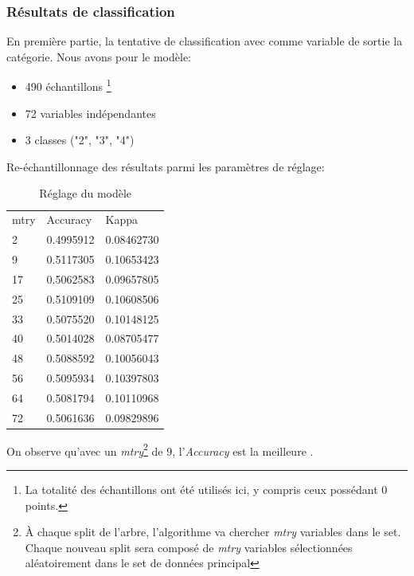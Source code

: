 \newpage
\subsubsection{Résultats de classification}
En première partie, la tentative de classification avec comme variable de sortie la catégorie. Nous avons pour le modèle:

\begin{itemize}
	\item 490 échantillons \footnote{La totalité des échantillons ont été utilisés ici, y compris ceux possédant 0 points.}
	\item 72 variables indépendantes
	\item 3 classes ("2", "3", "4")
\end{itemize}

Re-échantillonnage des résultats parmi les paramètres de réglage:

\begin{table}[H]
	\centering
	\caption{Réglage du modèle}
	\label{RF_Class_Resampling}
	\begin{tabular}{lll}
		mtry & Accuracy  & Kappa      \\
		2    & 0.4995912 & 0.08462730 \\
		9    & 0.5117305 & 0.10653423 \\
		17   & 0.5062583 & 0.09657805 \\
		25   & 0.5109109 & 0.10608506 \\
		33   & 0.5075520 & 0.10148125 \\
		40   & 0.5014028 & 0.08705477 \\
		48   & 0.5088592 & 0.10056043 \\
		56   & 0.5095934 & 0.10397803 \\
		64   & 0.5081794 & 0.10110968 \\
		72   & 0.5061636 & 0.09829896           
	\end{tabular}
\end{table}

\noindent On observe qu'avec un \textit{mtry}\footnote{À chaque split de l'arbre, l'algorithme va chercher \textit{mtry} variables dans le set. Chaque nouveau split sera composé de \textit{mtry} variables sélectionnées aléatoirement dans le set de données principal} de 9, l'\textit{Accuracy} est la meilleure .


